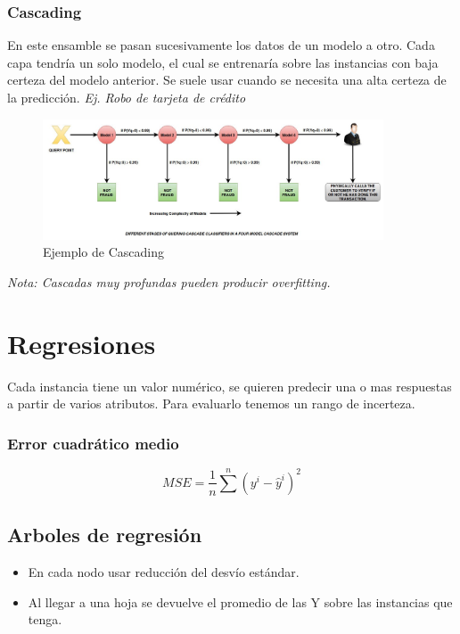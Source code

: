 \documentclass[titlepage,a4paper]{article}
\begin{document}
\subsubsection{Cascading}
En este ensamble se pasan sucesivamente los datos de un modelo a otro. Cada capa tendría un solo modelo, el cual se entrenaría sobre las instancias con baja certeza del modelo anterior. Se suele usar cuando se necesita una alta certeza de la predicción. \textit{Ej. Robo de tarjeta de crédito}


\begin{figure}[!htb]
    \centering
    \includegraphics[width=0.9\textwidth]{imagenesResumen/Cascading.jpeg}
    \caption{Ejemplo de Cascading}
\end{figure}


\textit{Nota: Cascadas muy profundas pueden producir overfitting.}

\newpage

\section{Regresiones}

Cada instancia tiene un valor numérico, se quieren predecir una o mas respuestas a partir de varios atributos. Para evaluarlo tenemos un rango de incerteza.

\subsubsection*{Error cuadrático medio}
\begin{equation}
    MSE = \frac{1}{n} \sum^{n} (y^{i}-\hat{y}^{i})^{2}
\end{equation}

\subsection{Arboles de regresión}
\begin{itemize}
    \item En cada nodo usar reducción del desvío estándar.
    \item Al llegar a una hoja se devuelve el promedio de las Y sobre las instancias que tenga.
\end{itemize}
\end{document}
